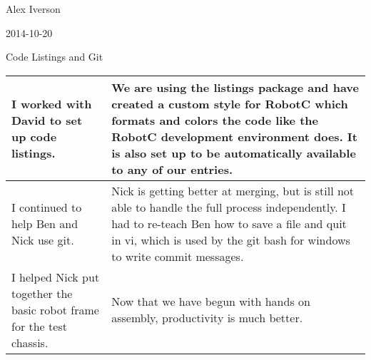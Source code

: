 Alex Iverson

2014-10-20

Code Listings and Git

\begin{tabular}{|p{5cm}|p{5cm}|}
 \hline
 I worked with David to set up code listings.&
 We are using the listings package and have created a custom style for RobotC which formats and colors the code like the RobotC development environment does. It is also set up to be automatically available to any of our entries. \\
 \hline
 I continued to help Ben and Nick use git.&
 Nick is getting better at merging, but is still not able to handle the full process independently. I had to re-teach Ben how to save a file and quit in vi, which is used by the git bash for windows to write commit messages.\\
 \hline
 I helped Nick put together the basic robot frame for the test chassis.&
 Now that we have begun with hands on assembly, productivity is much better.\\
 \hline
\end{tabular}